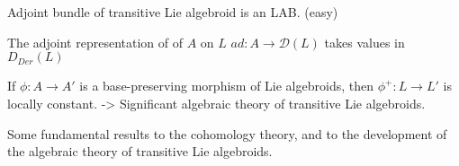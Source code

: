 \section{}

Adjoint bundle of transitive Lie algebroid is an LAB. (easy)

\quad The adjoint representation of of $A$ on $L$ $ad:A \to \mathcal D(L)$ takes values in $D_{Der}(L)$

If $\phi: A \to A'$  is a base-preserving morphism of Lie algebroids, then $\phi^+:L \to L'$ is locally constant. -> Significant algebraic theory of transitive Lie algebroids.

Some fundamental results to the cohomology theory, and to the development of the algebraic theory of transitive Lie algebroids.